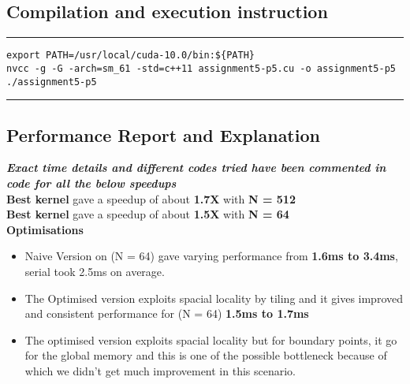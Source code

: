 \documentclass[a4paper]{article}
\begin{document}
\subsection{Compilation and execution instruction }
\vspace{0.3cm}
\hrule
\begin{lstlisting}
export PATH=/usr/local/cuda-10.0/bin:${PATH}
nvcc -g -G -arch=sm_61 -std=c++11 assignment5-p5.cu -o assignment5-p5
./assignment5-p5
\end{lstlisting}
\hrule 
\vspace{0.5cm}

\subsection{Performance Report and Explanation}
{\bf \emph{Exact time details and different codes tried have been commented in code for all the below speedups}}\\
\newline
{\bf Best kernel} gave a speedup of about {\bf 1.7X} with {\bf N = 512} \\
{\bf Best kernel} gave a speedup of about {\bf 1.5X} with {\bf N = 64} \\
\newline
{\bf \large Optimisations}
\begin{itemize}
\item Naive Version on (N = 64) gave varying performance from {\bf 1.6ms to 3.4ms}, serial took 2.5ms on average.
\item The Optimised version exploits spacial locality by tiling and it gives improved and consistent performance for (N = 64) {\bf 1.5ms to 1.7ms}
\item The optimised version exploits spacial locality but for boundary points, it go for the global memory and this is one of the possible bottleneck because of which we didn't get much improvement in this scenario.
\end{itemize}
\end{document}
